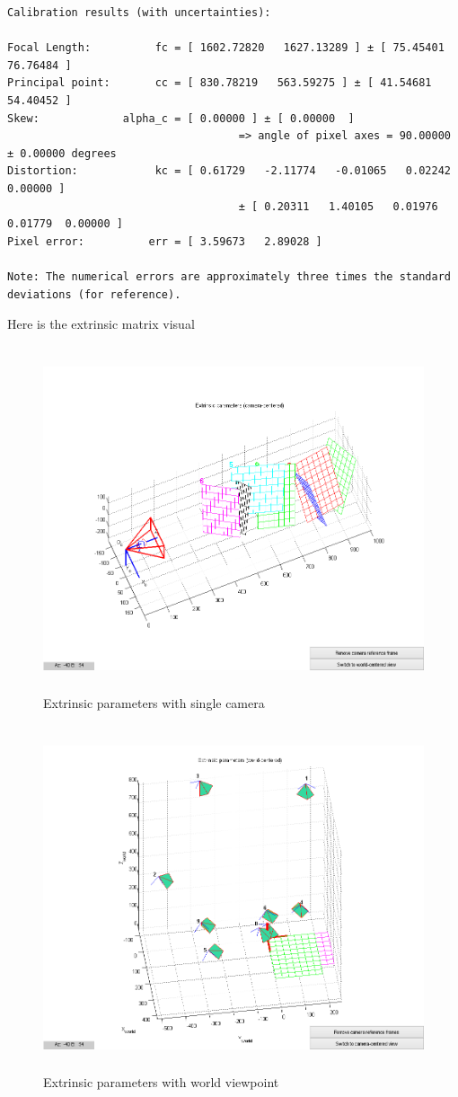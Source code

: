 \documentclass[11pt,psfig]{article}
\begin{document}
\begin{verbatim}
Calibration results (with uncertainties):

Focal Length:          fc = [ 1602.72820   1627.13289 ] ± [ 75.45401   76.76484 ]
Principal point:       cc = [ 830.78219   563.59275 ] ± [ 41.54681   54.40452 ]
Skew:             alpha_c = [ 0.00000 ] ± [ 0.00000  ]   
									=> angle of pixel axes = 90.00000 ± 0.00000 degrees
Distortion:            kc = [ 0.61729   -2.11774   -0.01065   0.02242  0.00000 ] 
									± [ 0.20311   1.40105   0.01976   0.01779  0.00000 ]
Pixel error:          err = [ 3.59673   2.89028 ]

Note: The numerical errors are approximately three times the standard deviations (for reference).

\end{verbatim}
Here is the extrinsic matrix visual
\begin{figure}[H]
\centering
\includegraphics[height=4in]{prob3plot3.png}
\caption{Extrinsic parameters with single camera}
\end{figure}
\begin{figure}[H]
\centering
\includegraphics[height=4in]{prob3plot4.png}
\caption{Extrinsic parameters with world viewpoint}
\end{figure}
\end{document}
